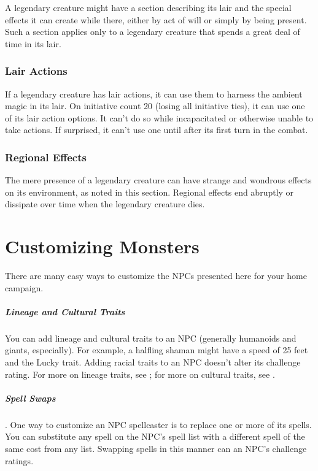 A legendary creature might have a section describing its lair and the special effects it can create while there, either by act of will or simply by being present. Such a section applies only to a legendary creature that spends a great deal of time in its lair.

\subsubsection{Lair Actions}

If a legendary creature has lair actions, it can use them to harness the ambient magic in its lair. On initiative count 20 (losing all initiative ties), it can use one of its lair action options. It can't do so while incapacitated or otherwise unable to take actions. If surprised, it can't use one until after its first turn in the combat.

\subsubsection{Regional Effects}

The mere presence of a legendary creature can have strange and wondrous effects on its environment, as noted in this section. Regional effects end abruptly or dissipate over time when the legendary creature dies.

\section{Customizing Monsters}

There are many easy ways to customize the NPCs presented here for your home campaign.

\subparagraph*{Lineage and Cultural Traits} You can add lineage and cultural traits to an NPC (generally humanoids and giants, especially). For example, a halfling shaman might have a speed of 25 feet and the Lucky trait. Adding racial traits to an NPC doesn't alter its challenge rating. For more on lineage traits, see ; for more on cultural traits, see .

\subparagraph*{Spell Swaps}. One way to customize an NPC spellcaster is to replace one or more of its spells. You can substitute any spell on the NPC's spell list with a different spell of the same cost from any list. Swapping spells in this manner can an NPC's challenge ratings.

